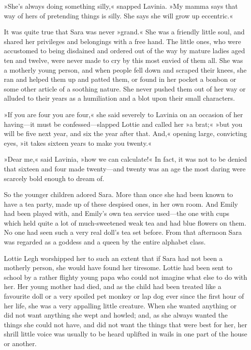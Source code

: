»She's always doing something silly,« snapped Lavinia. »My mamma says that way of hers of pretending things is silly. She says she will grow up eccentric.«

It was quite true that Sara was never »grand.« She was a friendly little soul, and shared her privileges and belongings with a free hand. The little ones, who were accustomed to being disdained and ordered out of the way by mature ladies aged ten and twelve, were never made to cry by this most envied of them all. She was a motherly young person, and when people fell down and scraped their knees, she ran and helped them up and patted them, or found in her pocket a bonbon or some other article of a soothing nature. She never pushed them out of her way or alluded to their years as a humiliation and a blot upon their small characters.

»If you are four you are four,« she said severely to Lavinia on an occasion of her having—it must be confessed—slapped Lottie and called her »a brat;« »but you will be five next year, and six the year after that. And,« opening large, convicting eyes, »it takes sixteen years to make you twenty.«

»Dear me,« said Lavinia, »how we can calculate!« In fact, it was not to be denied that sixteen and four made twenty—and twenty was an age the most daring were scarcely bold enough to dream of.

So the younger children adored Sara. More than once she had been known to have a tea party, made up of these despised ones, in her own room. And Emily had been played with, and Emily's own tea service used—the one with cups which held quite a lot of much-sweetened weak tea and had blue flowers on them. No one had seen such a very real doll's tea set before. From that afternoon Sara was regarded as a goddess and a queen by the entire alphabet class.

Lottie Legh worshipped her to such an extent that if Sara had not been a motherly person, she would have found her tiresome. Lottie had been sent to school by a rather flighty young papa who could not imagine what else to do with her. Her young mother had died, and as the child had been treated like a favourite doll or a very spoiled pet monkey or lap dog ever since the first hour of her life, she was a very appalling little creature. When she wanted anything or did not want anything she wept and howled; and, as she always wanted the things she could not have, and did not want the things that were best for her, her shrill little voice was usually to be heard uplifted in wails in one part of the house or another.

